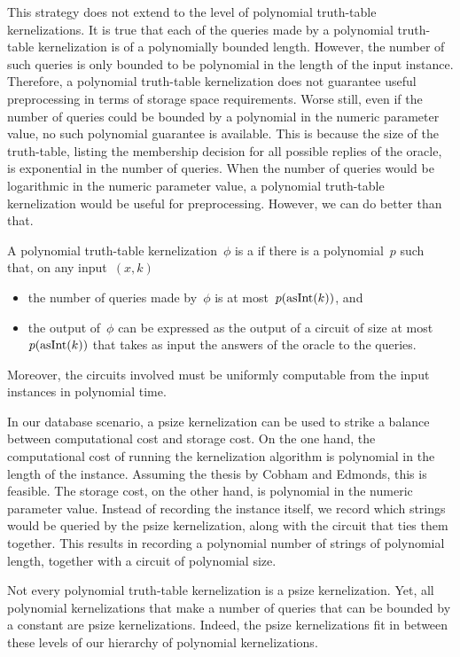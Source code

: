 This strategy does not extend to the level of polynomial truth-table kernelizations.
It is true that each of the queries made by a polynomial truth-table kernelization is of a polynomially bounded length.
However, the number of such queries is only bounded to be polynomial in the length of the input instance.
Therefore, a polynomial truth-table kernelization does not guarantee useful preprocessing in terms of storage space requirements.
Worse still, even if the number of queries could be bounded by a polynomial in the numeric parameter value, no such polynomial guarantee is available.
This is because the size of the truth-table, listing the membership decision for all possible replies of the oracle, is exponential in the number of queries.
When the number of queries would be logarithmic in the numeric parameter value, a polynomial truth-table kernelization would be useful for preprocessing.
However, we can do better than that.
\begin{definition}
  A polynomial truth-table kernelization~$\phi$ is a  if there is a polynomial~$p$ such that, on any input~$(x, k)$
  \begin{itemize}
  \item the number of queries made by~$\phi$ is at most~$p(\operatorname{asInt}(k))$, and
  \item the output of~$\phi$ can be expressed as the output of a circuit of size at most~$p(\operatorname{asInt}(k))$ that takes as input the answers of the oracle to the queries.
  \end{itemize}
  Moreover, the circuits involved must be uniformly computable from the input instances in polynomial time.
\end{definition}

In our database scenario, a psize kernelization can be used to strike a balance between computational cost and storage cost.
On the one hand, the computational cost of running the kernelization algorithm is polynomial in the length of the instance.
Assuming the thesis by Cobham and Edmonds, this is feasible.
The storage cost, on the other hand, is polynomial in the numeric parameter value.
Instead of recording the instance itself, we record which strings would be queried by the psize kernelization, along with the circuit that ties them together.
This results in recording a polynomial number of strings of polynomial length, together with a circuit of polynomial size.

Not every polynomial truth-table kernelization is a psize kernelization.
Yet, all polynomial kernelizations that make a number of queries that can be bounded by a constant are psize kernelizations.
Indeed, the psize kernelizations fit in between these levels of our hierarchy of polynomial kernelizations.

